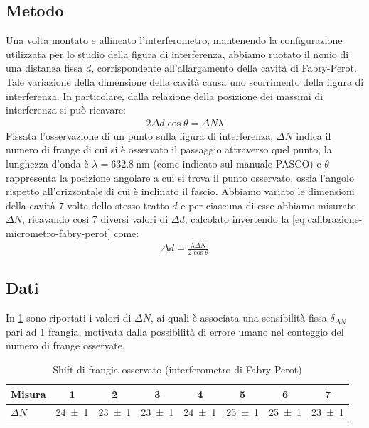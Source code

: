 \documentclass[a4paper]{article}
\begin{document}
\subsection{Metodo}
Una volta montato e allineato l'interferometro, mantenendo la configurazione utilizzata per lo studio della figura di interferenza, abbiamo ruotato il 
nonio di una distanza fissa $d$, corrispondente all'allargamento della cavità di Fabry-Perot. Tale variazione della dimensione della cavità causa uno
scorrimento della figura di interferenza. In particolare, dalla relazione della posizione dei massimi di interferenza si può ricavare:
\begin{align}
    2 \Delta d \cos  \theta = \Delta N \lambda
\label{eq:calibrazione-micrometro-fabry-perot}
\end{align}
Fissata l'osservazione di un punto sulla figura di interferenza, $\Delta N$ indica il numero di frange di cui si è osservato il passaggio attraverso quel punto, la lunghezza d'onda è $\lambda = \SI{632.8}{\nano\meter}$ (come indicato sul manuale PASCO) e $\theta$ rappresenta la posizione angolare a cui si trova il punto osservato, ossia l'angolo rispetto all'orizzontale di cui è inclinato il fascio.
Abbiamo variato le dimensioni della cavità 7 volte dello stesso tratto $d$ e per ciascuna di esse abbiamo misurato $\Delta N$, ricavando così 7 diversi valori di $\Delta d$, calcolato invertendo la \cref{eq:calibrazione-micrometro-fabry-perot} come:
\begin{align}
    \Delta d = \frac{\lambda \Delta N}{2\cos{\theta}}
\label{eq:calibrazione-micrometro-fabry-perot-invertita}
\end{align}

\subsection{Dati}
In \cref{tab:micrometro-fabry-perot} sono riportati i valori di $\Delta N$, ai quali è associata una sensibilità fissa $\delta_{\Delta N}$ pari ad 1 frangia, motivata dalla possibilità di errore umano nel conteggio del numero di frange osservate.

\begin{table}[htbp]
\centering
\caption{Shift di frangia osservato (interferometro di Fabry-Perot)}
\begin{tabular}{|l|ccccccc|}
\hline
Misura & 1 & 2 & 3 & 4 & 5 & 6 & 7 \\\hline\hline
$\Delta N$ & \num{24 \pm 1} & \num{23 \pm 1} & \num{23 \pm 1} & \num{24 \pm 1} & \num{25 \pm 1} & \num{25 \pm 1} & \num{23 \pm 1} \\\hline
\end{tabular}
\label{tab:micrometro-fabry-perot}
\end{table}
\end{document}
